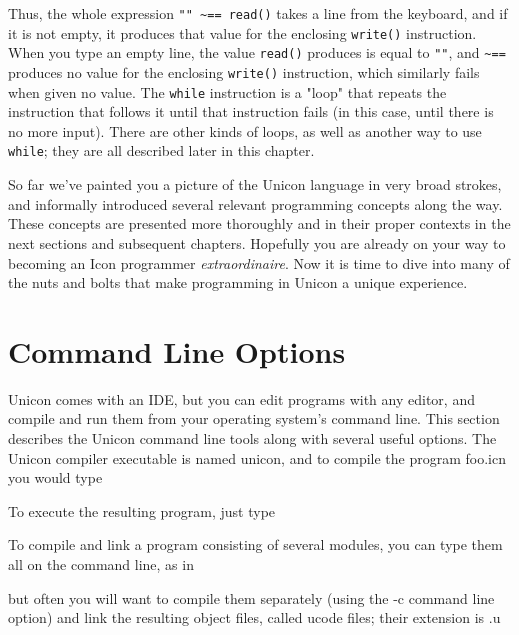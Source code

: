 Thus, the whole expression \texttt{"" \~{}==
read()} takes a line from the keyboard, and if it is not empty, it
produces that value for the enclosing \texttt{write()} instruction.
When you type an empty line, the value \texttt{read()} produces is
equal to \texttt{""}, and \texttt{\~{}==}
produces no value for the enclosing \texttt{write()} instruction, which
similarly fails when given no value. The \texttt{while}
instruction is a "loop" that
repeats the instruction that follows it until that instruction fails
(in this case, until there is no more input). There are other kinds of
loops, as well as another way to use \texttt{while}; they are all
described later in this chapter.

So far we've painted you a picture of the Unicon
language in very broad strokes, and informally introduced several
relevant programming concepts along the way. These concepts are
presented more thoroughly and in their proper contexts in the next
sections and subsequent chapters. Hopefully you are already on your way
to becoming an Icon programmer \textit{extraordinaire}. Now it is time
to dive into many of the nuts and bolts that make programming in Unicon
a unique experience.

\section{Command Line Options}

Unicon comes with an IDE, but you can edit programs with any
editor, and compile and run them from your operating
system's command line. This section describes the
Unicon command line tools along with several useful options. The Unicon
compiler executable is named unicon, and to compile the program foo.icn
you would type


\noindent To execute the resulting program, just type


To compile and link a program consisting of several modules, you can
type them all on the command line, as in


\noindent but often you will want to compile them separately
(using the -c command line option) and link the resulting object
files, called ucode files; their extension is .u


